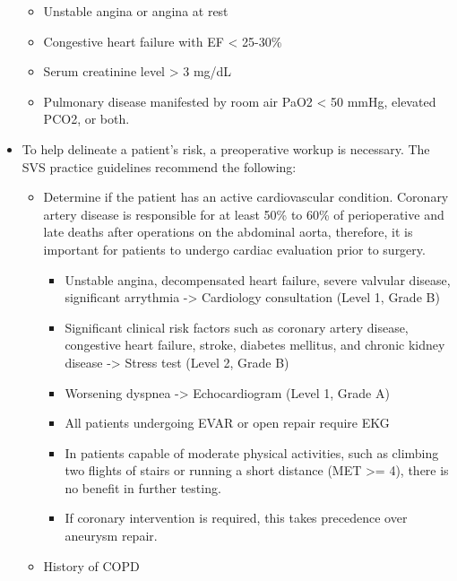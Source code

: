 \documentclass[
]{book}
\begin{document}
\begin{itemize}
  \begin{itemize}
  \item
    Unstable angina or angina at rest
  \item
    Congestive heart failure with EF \textless{} 25-30\%
  \item
    Serum creatinine level \textgreater{} 3 mg/dL
  \item
    Pulmonary disease manifested by room air PaO2 \textless{} 50 mmHg,
    elevated PCO2, or both.
  \end{itemize}
\item
  To help delineate a patient's risk, a preoperative workup is
  necessary. The SVS practice guidelines recommend the following:
  \citep{chaikofSocietyVascularSurgery2018a}

  \begin{itemize}
  \item
    Determine if the patient has an active cardiovascular condition.
    Coronary artery disease is responsible for at least 50\% to 60\%
    of perioperative and late deaths after operations on the
    abdominal aorta, therefore, it is important for patients to
    undergo cardiac evaluation prior to surgery.

    \begin{itemize}
    \item
      Unstable angina, decompensated heart failure, severe
      valvular disease, significant arrythmia -\textgreater{} Cardiology
      consultation (Level 1, Grade B)
    \item
      Significant clinical risk factors such as coronary artery
      disease, congestive heart failure, stroke, diabetes
      mellitus, and chronic kidney disease -\textgreater{} Stress test (Level
      2, Grade B)
    \item
      Worsening dyspnea -\textgreater{} Echocardiogram (Level 1, Grade A)
    \item
      All patients undergoing EVAR or open repair require EKG
    \item
      In patients capable of moderate physical activities, such as
      climbing two flights of stairs or running a short distance
      (MET \textgreater= 4), there is no benefit in further testing.
    \item
      If coronary intervention is required, this takes precedence
      over aneurysm repair.
    \end{itemize}
  \item
    History of COPD


\end{itemize}
\end{itemize}
\end{document}
